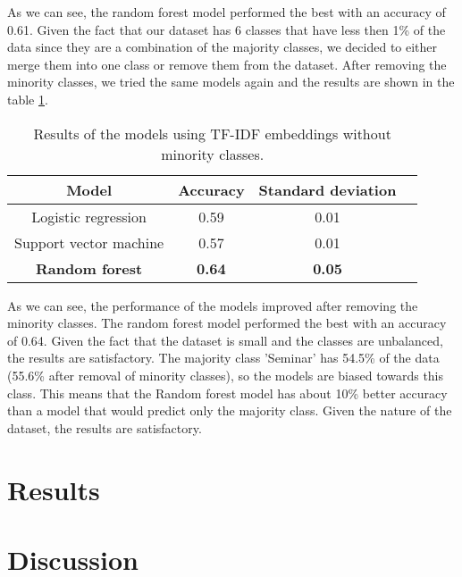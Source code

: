 \documentclass[fleqn,moreauthors,10pt]{ds_report}
\begin{document}
As we can see, the random forest model performed the best with an accuracy of 0.61. 
Given the fact that our dataset has 6 classes that have less then 1\% of the data since they are a combination of the majority classes, we decided to either merge them into one class or remove them from the dataset.
After removing the minority classes, we tried the same models again and the results are shown in the table \ref{tab:tfidf_results_no_compound}.

\begin{table}[h]
    \centering
    \begin{tabular}{|c|c|c|c|}
    \hline
    \textbf{Model} & \textbf{Accuracy} & \textbf{Standard deviation} \\ \hline
    Logistic regression & 0.59 & 0.01 \\ \hline
    Support vector machine & 0.57 & 0.01 \\ \hline
    \textbf{Random forest} & \textbf{0.64} & \textbf{0.05} \\ \hline
    \end{tabular}

    \caption{Results of the models using TF-IDF embeddings without minority classes.}
    \label{tab:tfidf_results_no_compound}
\end{table}

As we can see, the performance of the models improved after removing the minority classes. The random forest model performed the best with an accuracy of 0.64.
Given the fact that the dataset is small and the classes are unbalanced, the results are satisfactory. The majority class 'Seminar' has 54.5\% of the data (55.6\% after removal of minority classes), so the models are biased towards this class.
This means that the Random forest model has about 10\% better accuracy than a model that would predict only the majority class. Given the nature of the dataset, the results are satisfactory.


\section*{Results}











\section*{Discussion}
\end{document}
